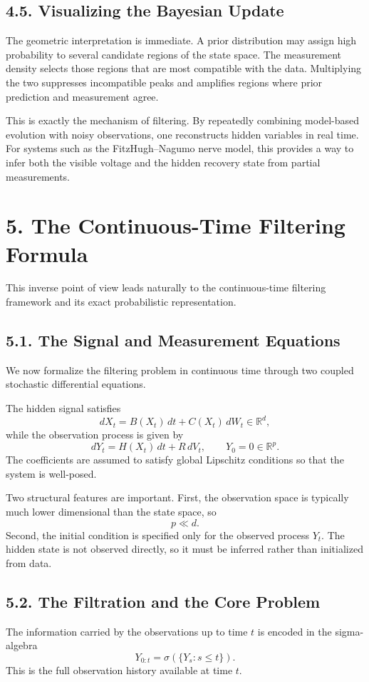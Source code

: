 \documentclass[11pt]{article}
\theoremstyle{definition}
\theoremstyle{remark}
\begin{document}
\subsection*{4.5. Visualizing the Bayesian Update}
The geometric interpretation is immediate. A prior distribution may assign high probability to several candidate regions of the state space. The measurement density selects those regions that are most compatible with the data. Multiplying the two suppresses incompatible peaks and amplifies regions where prior prediction and measurement agree.

This is exactly the mechanism of filtering. By repeatedly combining model-based evolution with noisy observations, one reconstructs hidden variables in real time. For systems such as the FitzHugh--Nagumo nerve model, this provides a way to infer both the visible voltage and the hidden recovery state from partial measurements.

\section*{5. The Continuous-Time Filtering Formula}
This inverse point of view leads naturally to the continuous-time filtering framework and its exact probabilistic representation.

\subsection*{5.1. The Signal and Measurement Equations}
We now formalize the filtering problem in continuous time through two coupled stochastic differential equations.

The hidden signal satisfies
\[
dX_t=B(X_t)\,dt+C(X_t)\,dW_t\in\mathbb R^d,
\]
while the observation process is given by
\[
dY_t=H(X_t)\,dt+R\,dV_t,
\qquad
Y_0=0\in\mathbb R^p.
\]
The coefficients are assumed to satisfy global Lipschitz conditions so that the system is well-posed.

Two structural features are important. First, the observation space is typically much lower dimensional than the state space, so
\[
p\ll d.
\]
Second, the initial condition is specified only for the observed process \(Y_t\). The hidden state is not observed directly, so it must be inferred rather than initialized from data.

\subsection*{5.2. The Filtration and the Core Problem}
The information carried by the observations up to time \(t\) is encoded in the sigma-algebra
\[
Y_{0:t}
=
\sigma(\{Y_s:s\le t\}).
\]
This is the full observation history available at time \(t\).
\end{document}
